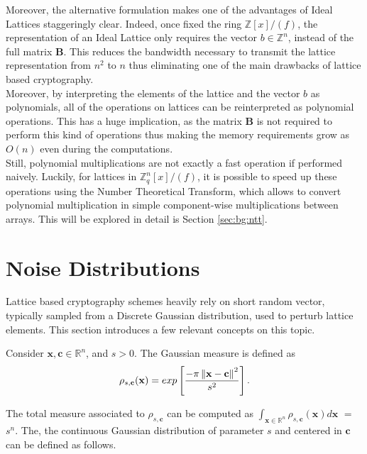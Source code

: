 Moreover, the alternative formulation makes one of the advantages of Ideal Lattices staggeringly clear. Indeed, once fixed the ring $\mathbb{Z}[x]/(f)$, the representation of an Ideal Lattice only requires the vector $b\in\mathbb{Z}^n$, instead of the full matrix $\mathbf{B}$. This reduces the bandwidth necessary to transmit the lattice representation from $n^2$ to $n$ thus eliminating one of the main drawbacks of lattice based cryptography.\\
Moreover, by interpreting the elements of the lattice and the vector $b$ as polynomials, all of the operations on lattices can be reinterpreted as polynomial operations. This has a huge implication, as the matrix $\mathbf{B}$ is not required to perform this kind of operations thus making the memory requirements grow as $O(n)$ even during the computations.\\
Still, polynomial multiplications are not exactly a fast operation if performed naively. Luckily, for lattices in $\mathbb{Z}_q^n[x]/(f)$, it is possible to speed up these operations using the Number Theoretical Transform, which allows to convert polynomial multiplication in simple component-wise multiplications between arrays. This will be explored in detail is Section \ref{sec:bg:ntt}.

\section{Noise Distributions}
Lattice based cryptography schemes heavily rely on short random vector, typically sampled from a Discrete Gaussian distribution, used to perturb lattice elements. This section introduces a few relevant concepts on this topic.\\

\begin{definition}
Consider $\mathbf{x},\mathbf{c}\in\mathbb{R}^n$, and $s>0$. The Gaussian measure is defined as
\begin{equation*}
\rho_{s,\mathbf{c}}(\mathbf{x}) = exp\left[\frac{-\pi\left\lVert \mathbf{x}-\mathbf{c} \right\rVert^2}{s^2}\right].
\end{equation*}
\end{definition}

The total measure associated to $\rho_{s,\mathbf{c}}$ can be computed as $\int_{\mathbf{x}\in\mathbb{R}^n}\rho_{s,\mathbf{c}}(\mathbf{x})d\mathbf{x}$ $=$ $s^n$. The, the continuous Gaussian distribution of parameter $s$ and centered in $\mathbf{c}$ can be defined as follows.

